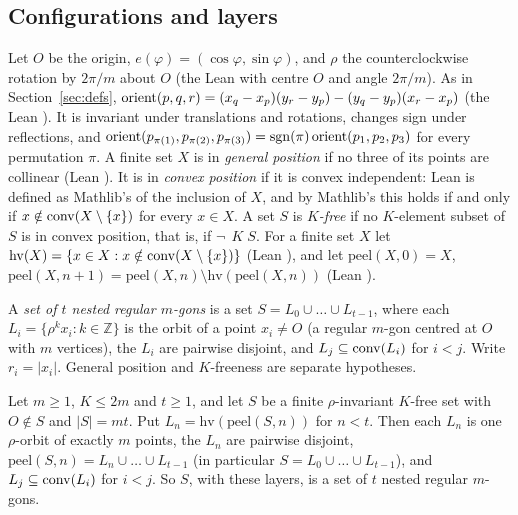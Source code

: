 \subsection{Configurations and layers}\label{k8s:sec:setting}

Let $O$ be the origin, $e(\varphi)=(\cos\varphi,\sin\varphi)$, and $\rho$ the counterclockwise rotation by $2\pi/m$
about $O$ (the Lean  with centre $O$ and angle $2\pi/m$). As in Section~\ref{sec:defs},
$\operatorname{orient}(p,q,r)=(x_q-x_p)(y_r-y_p)-(y_q-y_p)(x_r-x_p)$ (the Lean ). It is invariant under translations
and rotations, changes sign under reflections, and $\operatorname{orient}(p_{\pi(1)},p_{\pi(2)},p_{\pi(3)})=\operatorname{sgn}(\pi)\operatorname{orient}(p_1,p_2,p_3)$
for every permutation $\pi$. A finite set $X$ is in \emph{general position} if no three of its points are collinear
(Lean ). It is in \emph{convex position} if it is convex independent: Lean 
is defined as Mathlib's  of the inclusion of $X$, and by Mathlib's
 this holds if and only if $x\notin\operatorname{conv}(X\setminus\{x\})$ for
every $x\in X$. A set $S$ is \emph{$K$-free} if no $K$-element subset of $S$ is in convex position, that is, if
$\neg\,$$\;K\;S$. For a finite set $X$ let $\mathrm{hv}(X)=\{x\in X: x\notin\operatorname{conv}(X\setminus\{x\})\}$
(Lean ), and let $\mathrm{peel}(X,0)=X$,
$\mathrm{peel}(X,n+1)=\mathrm{peel}(X,n)\setminus\mathrm{hv}(\mathrm{peel}(X,n))$ (Lean ).

\begin{definition}\label{k8s:def:nested}
A \emph{set of $t$ nested regular $m$-gons} is a set $S=L_0\cup\dots\cup L_{t-1}$, where each $L_i=\{\rho^kx_i:k\in\mathbb Z\}$
is the orbit of a point $x_i\ne O$ (a regular $m$-gon centred at $O$ with $m$ vertices), the $L_i$ are pairwise
disjoint, and $L_j\subseteq\operatorname{conv}(L_i)$ for $i<j$. Write $r_i=|x_i|$. General position and $K$-freeness are separate
hypotheses.
\end{definition}

\begin{lemma}\label{k8s:lem:layer}
Let $m\ge1$, $K\le2m$ and $t\ge1$, and let $S$ be a finite $\rho$-invariant $K$-free set with $O\notin S$ and $|S|=mt$.
Put $L_n=\mathrm{hv}(\mathrm{peel}(S,n))$ for $n<t$. Then each $L_n$ is one $\rho$-orbit of exactly $m$ points, the $L_n$
are pairwise disjoint, $\mathrm{peel}(S,n)=L_n\cup\dots\cup L_{t-1}$ (in particular $S=L_0\cup\dots\cup L_{t-1}$), and
$L_j\subseteq\operatorname{conv}(L_i)$ for $i<j$. So $S$, with these layers, is a set of $t$ nested regular $m$-gons.
\end{lemma}

